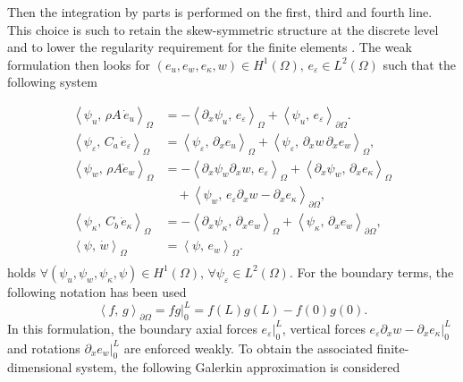 \documentclass{ifacconf}
\newcommand{\inner}[3][]{\ensuremath{\left\langle #2, \, #3 \right\rangle_{#1}}}
\begin{document}
Then the integration by parts is performed on the first, third and fourth line. This choice is such to retain the skew-symmetric structure at the discrete level and to lower the regularity requirement for the finite elements \cite[Chap. 8]{brugnoli2020thesis}. The weak formulation then looks for $(e_u, e_w, e_\kappa, w) \in H^1(\Omega), \, e_\varepsilon \in L^2(\Omega)$ such that the following system

\begin{equation}\label{eq:weak_form}
	\begin{aligned}
		\inner[\Omega]{\psi_u}{\rho A \, \dot{e}_u} &= -\inner[\Omega]{\partial_x \psi_u}{ e_\varepsilon} +  \inner[\partial\Omega]{\psi_u}{e_\varepsilon}. \\
		\inner[\Omega]{\psi_\varepsilon}{C_a \, \dot{e}_\varepsilon} &= \inner[\Omega]{\psi_\varepsilon}{\partial_x e_u} + \inner[\Omega]{\psi_\varepsilon}{\partial_x w \, \partial_x e_w}, \\
		\inner[\Omega]{\psi_w}{\rho A\dot{e}_w} &= -\inner[\Omega]{\partial_x \psi_w \partial_x w}{e_\varepsilon} + \inner[\Omega]{\partial_{x} \psi_w}{\partial_{x} e_\kappa} \\
		&\quad +\inner[\partial\Omega]{\psi_w}{e_\varepsilon \partial_x w - \partial_x e_\kappa}, \\
		\inner[\Omega]{\psi_\kappa}{C_b \, \dot{e}_\kappa} &= - \inner[\Omega]{\partial_{x} \psi_\kappa}{\partial_{x} e_w} + \inner[\partial\Omega]{\psi_\kappa}{\partial_x e_w}, \\
		\inner[\Omega]{\psi}{\dot{w}} &= \inner[\Omega]{\psi}{e_w}. \\
	\end{aligned}
\end{equation}
holds $\forall (\psi_u, \psi_w, \psi_\kappa, \psi) \in H^1(\Omega), \, \forall \psi_\varepsilon \in L^2(\Omega)$. For the boundary terms, the following notation has been used
\begin{equation*}
	\inner[\partial\Omega]{f}{g} = f g \vert_{0}^L = f(L)g(L) - f(0)g(0).
\end{equation*} 
In this formulation, the boundary axial forces $e_\varepsilon\vert_{0}^L$, vertical forces $e_\varepsilon\partial_x w - \partial_x e_\kappa\vert_{0}^L$ and  rotations $\partial_x e_w\vert_{0}^L$ are enforced weakly. To obtain the associated finite-dimensional system, the following Galerkin approximation is considered 
\end{document}
